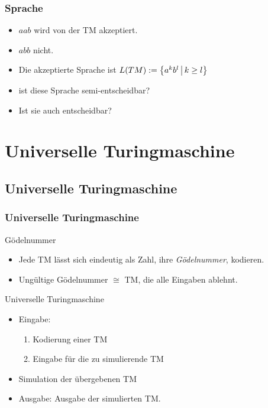 \begin{frame}
 \frametitle{Sprache}
 \begin{itemize}
  \item $aab$ wird von der TM akzeptiert.
  \item $abb$ nicht.
  \item Die akzeptierte Sprache ist $L(TM) := \left\lbrace a^kb^l \,\middle\vert\, k \geq l \right\rbrace$
 

 \hfill 
 \resizebox{8cm}{!} {%
  \thetm
 }
  \invincible
  \pause
 \ducttape{-6cm} 
  \item ist diese Sprache semi-entscheidbar?
  \pause
  \item Ist sie auch entscheidbar?
  \vincible
 \end{itemize}
 
\end{frame}



\section{Universelle Turingmaschine}
\subsection{Universelle Turingmaschine}
\begin{frame}
\frametitle{Universelle Turingmaschine}
\begin{block}{Gödelnummer}
\begin{itemize}
\item Jede TM lässt sich eindeutig als Zahl, ihre \emph{Gödelnummer}, kodieren.
\item Ungültige Gödelnummer $\cong$ TM, die alle Eingaben ablehnt.
\end{itemize}
\end{block}
\begin{block}{Universelle Turingmaschine}
\begin{itemize}

\item Eingabe:
\begin{enumerate}
\item Kodierung einer TM
\item Eingabe für die zu simulierende TM
\end{enumerate}
\item Simulation der übergebenen TM
\item Ausgabe: Ausgabe der simulierten TM.
\end{itemize}
\end{block}
\end{frame}



